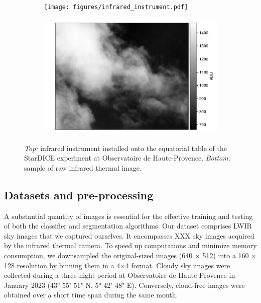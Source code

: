 \documentclass[amt, article]{copernicus}
\begin{document}
\begin{figure}[t]
    \centering
    \begin{subfigure}[b]{0.9\hsize}
        \texttt{[image: figures/infrared\_instrument.pdf]}
    \end{subfigure}
    \hfill
    \begin{subfigure}[b]{\hsize}
        \includegraphics[width=\textwidth]{figures/sample_sky_image.pdf}
    \end{subfigure}
    \caption{\textit{Top:} infrared instrument installed onto the equatorial table of the StarDICE experiment at Observatoire de Haute-Provence. \textit{Bottom:} sample of raw infrared thermal image.}
    \label{fig:infrared_system}
\end{figure}

\subsection{Datasets and pre-processing}

A substantial quantity of images is essential for the effective training and testing of both the classifier and segmentation algorithms. Our dataset comprises LWIR sky images that we captured ourselves. It encompasses XXX sky images acquired by the infrared thermal camera. To speed up computations and minimize memory consumption, we downsampled the original-sized images (640 $\times$ 512) into a 160 $\times$ 128 resolution by binning them in a 4$\times$4 format. Cloudy sky images were collected during a three-night period at Observatoire de Haute-Provence in January 2023 (43° 55' 51" N, 5° 42' 48" E). Conversely, cloud-free images were obtained over a short time span during the same month.
\end{document}
